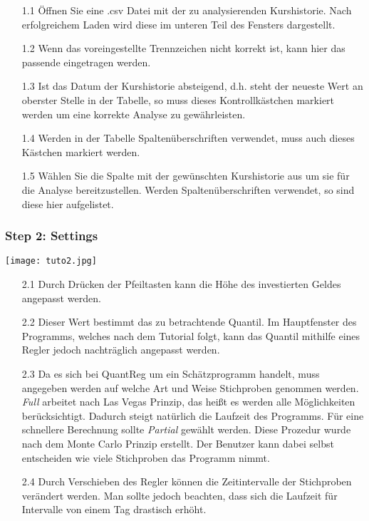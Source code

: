 \documentclass{scrartcl}
\begin{document}
\begin{enumerate}
\item[1.1]{Öffnen Sie eine .csv Datei mit der zu analysierenden Kurshistorie. Nach erfolgreichem Laden wird diese im unteren Teil des Fensters dargestellt.}
\item[1.2]{Wenn das voreingestellte Trennzeichen nicht korrekt ist, kann hier das passende eingetragen werden.}
\item[1.3]{Ist das Datum der Kurshistorie absteigend, d.h. steht der neueste Wert an oberster Stelle in der Tabelle, so muss dieses Kontrollkästchen markiert werden um eine korrekte Analyse zu gewährleisten.}
\item[1.4]{Werden in der Tabelle Spaltenüberschriften verwendet, muss auch dieses Kästchen markiert werden.}
\item[1.5]{Wählen Sie die Spalte mit der gewünschten Kurshistorie aus um sie für die Analyse bereitzustellen. Werden Spaltenüberschriften verwendet, so sind diese hier aufgelistet.} 
\end{enumerate}

\subsubsection*{Step 2: Settings}
\begin{center}
\texttt{[image: tuto2.jpg]}
\end{center}

\begin{enumerate}
\item[2.1]{Durch Drücken der Pfeiltasten kann die Höhe des investierten Geldes angepasst werden.}
\item[2.2]{Dieser Wert bestimmt das zu betrachtende Quantil. Im Hauptfenster des Programms, welches nach dem Tutorial folgt, kann das Quantil mithilfe eines Regler jedoch nachträglich angepasst werden.}
\item[2.3]{Da es sich bei QuantReg um ein Schätzprogramm handelt, muss angegeben werden auf welche Art und Weise Stichproben genommen werden. \textit{Full} arbeitet nach Las Vegas Prinzip, das heißt es werden alle Möglichkeiten berücksichtigt. Dadurch steigt natürlich die Laufzeit des Programms. Für eine schnellere Berechnung sollte \textit{Partial} gewählt werden. Diese Prozedur wurde nach dem Monte Carlo Prinzip erstellt. Der Benutzer kann dabei selbst entscheiden wie viele Stichproben das Programm nimmt.}
\item[2.4]{Durch Verschieben des Regler können die Zeitintervalle der Stichproben verändert werden. Man sollte jedoch beachten, dass sich die Laufzeit für Intervalle von einem Tag drastisch erhöht.}
\end{enumerate}
\end{document}
